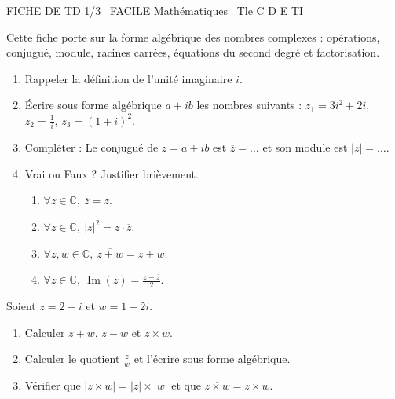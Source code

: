 \documentclass[11pt]{article}
\begin{document}
\begin{tcolorbox}[enhanced,colback=popink,colframe=popink,arc=10pt,boxrule=0pt,left=12pt,right=12pt,top=9pt,bottom=9pt]
{\color{white}\popxbold\small FICHE DE TD 1/3 \textbullet\ FACILE \hfill Mathématiques \textbullet\ Tle C D E TI\par}
\end{tcolorbox}
\vspace{4pt}
Cette fiche porte sur la forme algébrique des nombres complexes : opérations, conjugué, module, racines carrées, équations du second degré et factorisation.

\begin{exercice}
\begin{enumerate}
    \item Rappeler la définition de l'unité imaginaire $i$.
    \item Écrire sous forme algébrique $a+ib$ les nombres suivants : $z_1 = 3i^2 + 2i$, $z_2 = \frac{1}{i}$, $z_3 = (1+i)^2$.
    \item Compléter : Le conjugué de $z=a+ib$ est $\overline{z} = \ldots$ et son module est $|z| = \ldots$.
    \item Vrai ou Faux ? Justifier brièvement.
    \begin{enumerate}
        \item $\forall z \in \mathbb{C},\ \overline{\overline{z}} = z$.
        \item $\forall z \in \mathbb{C},\ |z|^2 = z \cdot \overline{z}$.
        \item $\forall z, w \in \mathbb{C},\ \overline{z+w} = \overline{z} + \overline{w}$.
        \item $\forall z \in \mathbb{C},\ \operatorname{Im}(z) = \frac{z - \overline{z}}{2}$.
    \end{enumerate}
\end{enumerate}
\end{exercice}

\begin{exercice}
Soient $z = 2 - i$ et $w = 1 + 2i$.
\begin{enumerate}
    \item Calculer $z + w$, $z - w$ et $z \times w$.
    \item Calculer le quotient $\frac{z}{w}$ et l'écrire sous forme algébrique.
    \item Vérifier que $|z \times w| = |z| \times |w|$ et que $\overline{z \times w} = \overline{z} \times \overline{w}$.
\end{enumerate}
\end{exercice}
\end{document}
